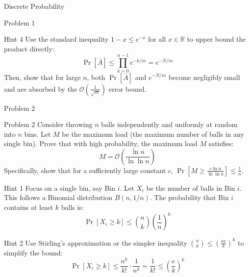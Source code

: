 \documentclass{beamer}
\begin{document}
\begin{section}{Discrete Probability}
\begin{subsection}{Problem 1}
    \begin{frame}
        \begin{block}{Hint 4}
            Use the standard inequality $1 - x \le e^{-x}$ for all $x \in \mathbb{R}$ to upper bound the product directly:
            \[
                \Pr[\bar{A}] \le \prod_{k=0}^{n-1} e^{-k/m} = e^{-N/m}
            \]
            Then, show that for large $n$, both $\Pr[\bar{A}]$ and $e^{-N/m}$ become negligibly small and are absorbed by the $\mathcal{O}\left(\frac{1}{\sqrt{m}}\right)$ error bound.
        \end{block}
    \end{frame}
\end{subsection}

\begin{subsection}{Problem 2}
    \begin{frame}
        \begin{block}{Problem 2}
            Consider throwing $n$ balls independently and uniformly at random into $n$ bins. Let $M$ be the maximum load (the maximum number of balls in any single bin). Prove that with high probability, the maximum load $M$ satisfies:
            \[
                M = \mathcal{O}\left( \frac{\ln n}{\ln \ln n} \right)
            \]
            Specifically, show that for a sufficiently large constant $c$, $\Pr\left[ M \ge \frac{c \ln n}{\ln \ln n} \right] \le \frac{1}{n}$.
        \end{block}
    \end{frame}

    \begin{frame}
        \begin{block}{Hint 1}
            Focus on a single bin, say Bin $i$. Let $X_i$ be the number of balls in Bin $i$. This follows a Binomial distribution $B(n, 1/n)$. The probability that Bin $i$ contains at least $k$ balls is:
            \[
                \Pr[X_i \ge k] \le \binom{n}{k} \left( \frac{1}{n} \right)^k
            \]
        \end{block}

        \pause
        \vspace{1em}
        \begin{block}{Hint 2}
            Use Stirling's approximation or the simpler inequality $\binom{n}{k} \le \left( \frac{ne}{k} \right)^k$ to simplify the bound:
            \[
                \Pr[X_i \ge k] \le \frac{n^k}{k!} \cdot \frac{1}{n^k} = \frac{1}{k!} \le \left( \frac{e}{k} \right)^k
            \]
        \end{block}
    \end{frame}


\end{subsection}
\end{section}
\end{document}
